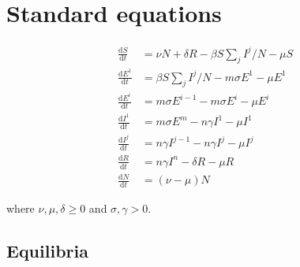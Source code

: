 \documentclass[fleqn]{article}
\begin{document}
\setlength{\parindent}{0in}
\setlength{\parskip}{0.2in}

\section{Standard equations}

\begin{subequations}
\begin{align}
  \frac{\text{d} S    }{\text{d} t}
  &= \nu N + \delta R - \beta S \sum\nolimits_{j} I^{j} / N - \mu S \\
  \frac{\text{d} E^{1}}{\text{d} t}
  &= \beta S \sum\nolimits_{j} I^{j} / N - m \sigma E^{1} - \mu E^{1} \\
  \frac{\text{d} E^{i}}{\text{d} t}
  &= m \sigma E^{i-1} - m \sigma E^{i} - \mu E^{i} \\
  \frac{\text{d} I^{1}}{\text{d} t}
  &= m \sigma E^{m} - n \gamma I^{1} - \mu I^{1} \\
  \frac{\text{d} I^{j}}{\text{d} t}
  &= n \gamma I^{j-1} - n \gamma I^{j} - \mu I^{j} \\
  \frac{\text{d} R    }{\text{d} t}
  &= n \gamma I^{n} - \delta R - \mu R \\
  \frac{\text{d} N    }{\text{d} t}
  &= (\nu - \mu) N
\end{align}
\end{subequations}

where $\nu,\mu,\delta \geq 0$ and $\sigma,\gamma > 0$.

\subsection{Equilibria}
\end{document}
